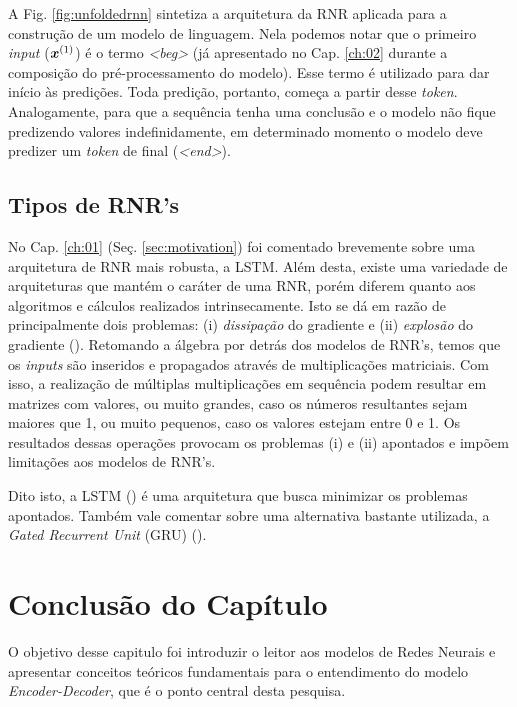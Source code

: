 

A Fig. \ref{fig:unfoldedrnn} sintetiza a arquitetura da RNR aplicada para a construção de um modelo de linguagem. Nela podemos notar que o primeiro \textit{input} ($\bm{x}^{(1)}$) é o termo \textit{<beg>} (já apresentado no Cap. \ref{ch:02} durante a composição do pré-processamento do modelo). Esse termo é utilizado para dar início às predições. Toda predição, portanto, começa a partir desse \textit{token}. Analogamente, para que a sequência tenha uma conclusão e o modelo não fique predizendo valores indefinidamente, em determinado momento o modelo deve predizer um \textit{token} de final (\textit{<end>}).  



\subsection{Tipos de RNR's}

No Cap. \ref{ch:01} (Seç. \ref{sec:motivation}) foi comentado brevemente sobre uma arquitetura de RNR mais robusta, a LSTM. Além desta, existe uma variedade de arquiteturas que mantém o caráter de uma RNR, porém diferem quanto aos algoritmos e cálculos realizados intrinsecamente. Isto se dá em razão de principalmente dois problemas: (i) \textit{dissipação} do gradiente e (ii) \textit{explosão} do gradiente  (\cite{Goodfellow-et-al-2016}). Retomando a álgebra por detrás dos modelos de RNR's, temos que os \textit{inputs} são inseridos e propagados através de multiplicações matriciais. Com isso, a realização de múltiplas multiplicações em sequência podem resultar em matrizes com valores, ou muito grandes, caso os números resultantes sejam maiores que 1, ou muito pequenos, caso os valores estejam entre 0 e 1. Os resultados dessas operações provocam os problemas (i) e (ii) apontados e impõem limitações aos modelos de RNR's. 

Dito isto, a LSTM (\cite{hochreiter:1997}) é uma arquitetura que busca minimizar os problemas apontados. Também vale comentar sobre uma alternativa bastante utilizada, a \textit{Gated Recurrent Unit} (GRU) (\cite{josh:2017}).

\section{Conclusão do Capítulo}

O objetivo desse capitulo foi introduzir o leitor aos modelos de Redes Neurais e apresentar conceitos teóricos fundamentais para o entendimento do modelo \textit{Encoder-Decoder}, que é o ponto central desta pesquisa.

